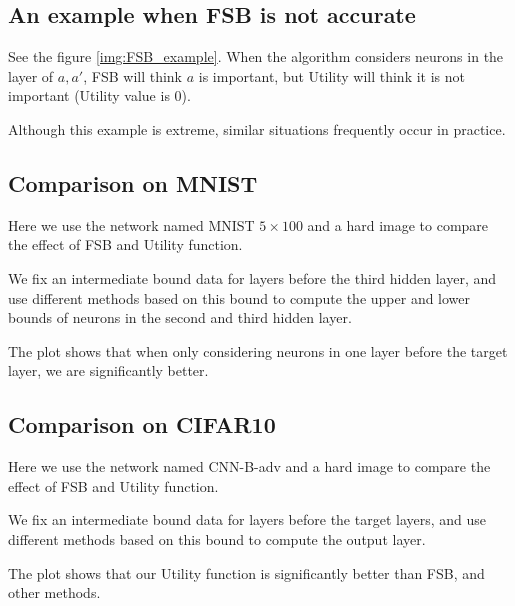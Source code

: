\subsection*{An example when FSB is not accurate}

See the figure \ref{img:FSB_example}. When the algorithm considers neurons in the layer of $a,a'$, FSB will think $a$ is important, but Utility will think it is not important (Utility value is 0).

Although this example is extreme, similar situations frequently occur in practice.

\subsection*{Comparison on MNIST}

Here we use the network named MNIST $5\times 100$ and a hard image to compare the effect of FSB and Utility function. 

We fix an intermediate bound data for layers before the third hidden layer, and use different methods based on this bound to compute the upper and lower bounds of neurons in the second and third hidden layer.

The plot shows that when only considering neurons in one layer before the target layer, we are significantly better.


\subsection*{Comparison on CIFAR10}

Here we use the network named CNN-B-adv and a hard image to compare the effect of FSB and Utility function. 

We fix an intermediate bound data for layers before the target layers, and use different methods based on this bound to compute the output layer.

The plot shows that our Utility function is significantly better than FSB, and other methods.

